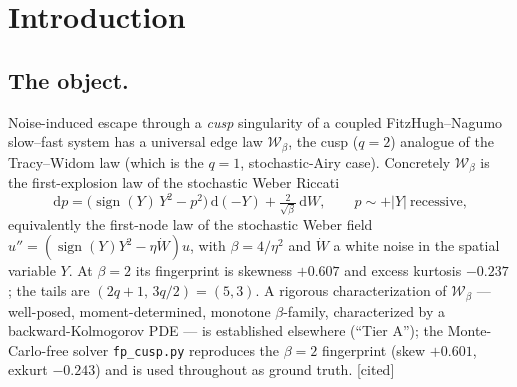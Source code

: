 \documentclass[11pt,reqno]{amsart}
\theoremstyle{plain}
\theoremstyle{definition}
\theoremstyle{remark}
\newcommand{\dd}{\,\mathrm{d}}
\newcommand{\W}{\mathcal{W}}
\newcommand{\tagC}{{\footnotesize\textsf{[cited]}}}
\begin{document}
\maketitle

\section{Introduction}

\subsection{The object.}
Noise-induced escape through a \emph{cusp} singularity of a coupled FitzHugh--Nagumo
slow--fast system has a universal edge law $\W_\beta$, the cusp ($q=2$) analogue of the
Tracy--Widom law (which is the $q=1$, stochastic-Airy case). Concretely $\W_\beta$ is the
first-explosion law of the stochastic Weber Riccati
\begin{equation}\label{eq:riccati}
\dd p=\bigl(\operatorname{sign}(Y)\,Y^2-p^2\bigr)\dd(-Y)+\tfrac{2}{\sqrt\beta}\dd W,
\qquad p\sim+|Y|\ \text{recessive},
\end{equation}
equivalently the first-node law of the stochastic Weber field
$u''=(\operatorname{sign}(Y)Y^2-\eta\dot W)u$, with $\beta=4/\eta^2$ and $\dot W$ a white noise
in the spatial variable $Y$. At $\beta=2$ its fingerprint is skewness $+0.607$ and excess
kurtosis $-0.237$; the tails are $(2q+1,\,3q/2)=(5,3)$. A rigorous characterization of
$\W_\beta$ --- well-posed, moment-determined, monotone $\beta$-family, characterized by a
backward-Kolmogorov PDE --- is established elsewhere (``Tier A''); the Monte-Carlo-free solver
\texttt{fp\_cusp.py} reproduces the $\beta=2$ fingerprint (skew $+0.601$, exkurt $-0.243$) and
is used throughout as ground truth. \tagC
\end{document}
